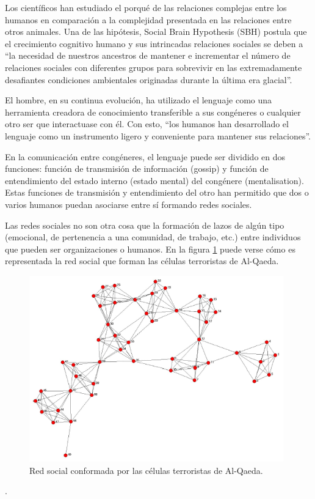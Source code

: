 Los científicos han estudiado el porqué de las relaciones complejas entre los humanos en comparación a la complejidad presentada en las relaciones entre otros animales. Una de las hipótesis, Social Brain Hypothesis (SBH) postula que el crecimiento cognitivo humano y sus intrincadas relaciones sociales se deben a “la necesidad de nuestros ancestros de mantener e incrementar el número de relaciones sociales con diferentes grupos para sobrevivir en las extremadamente desafiantes condiciones ambientales originadas durante la última era glacial”.\cite[pag.3]{dynamics}

El hombre, en su continua evolución, ha utilizado el lenguaje como una herramienta creadora de conocimiento transferible a sus congéneres o cualquier otro ser que interactuase con él. Con esto, “los humanos han desarrollado el lenguaje como un instrumento ligero y conveniente para mantener sus relaciones”\cite[pag.3]{dynamics}. 

En la comunicación entre congéneres, el lenguaje puede ser dividido en dos funciones: función de transmisión de información (gossip) y función de entendimiento del estado interno (estado mental) del congénere (mentalisation)\cite[pag.3]{dynamics}. Estas funciones de transmisión y entendimiento del otro han permitido que dos o varios humanos puedan asociarse entre sí formando redes sociales.

Las redes sociales no son otra cosa que la formación de lazos de algún tipo (emocional, de pertenencia a una comunidad, de trabajo, etc.) entre individuos que pueden ser organizaciones o humanos.\cite[pag.6-13]{sna_startups} En la figura \ref{fig:red_al_quaeda} puede verse cómo es representada la red social que forman las células terroristas de Al-Qaeda.

\begin{figure}[!htb]
  \begin{center}
    \includegraphics[width=11cm]{./imagenes/red_al_qaeda.png}
    \caption{Red social conformada por las células terroristas de Al-Qaeda.}
    \label{fig:red_al_quaeda}
  \end{center}
\end{figure}.

